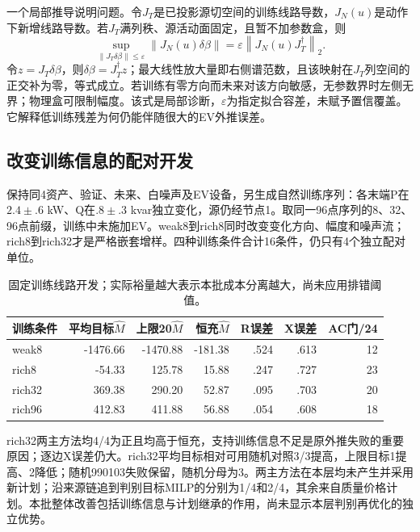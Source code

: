 \documentclass[UTF8,fontset=fandol,11pt,a4paper]{ctexart}
\newcommand{\norm}[1]{\left\lVert#1\right\rVert}
\begin{document}
一个局部推导说明问题。令$J_T$是已投影源切空间的训练线路导数，$J_N(u)$是动作下新增线路导数。若$J_T$满列秩、源活动面固定，且暂不加参数盒，则
\begin{equation}
 \sup_{\norm{J_T\delta\beta}\le\varepsilon}\norm{J_N(u)\delta\beta}
 =\varepsilon\norm{J_N(u)J_T^\dagger}_2.
 \label{eq:fixedtrain-amplification}
\end{equation}
令$z=J_T\delta\beta$，则$\delta\beta=J_T^\dagger z$；最大线性放大量即右侧谱范数，且该映射在$J_T$列空间的正交补为零，等式成立。若训练有零方向而未来对该方向敏感，无参数界时左侧无界；物理盒可限制幅度。该式是局部诊断，$\varepsilon$为指定拟合容差，未赋予置信覆盖。它解释低训练残差为何仍能伴随很大的EV外推误差。

\subsection{改变训练信息的配对开发}
保持同4资产、验证、未来、白噪声及EV设备，另生成自然训练序列：各末端P在$2.4\pm.6$ kW、Q在$.8\pm.3$ kvar独立变化，源仍经节点1。取同一96点序列的8、32、96点前缀，训练中未施加EV。weak8到rich8同时改变变化方向、幅度和噪声流；rich8到rich32才是严格嵌套增样。四种训练条件合计16条件，仍只有4个独立配对单位。

\begin{table}[htbp]\centering\small
\caption{固定训练线路开发；实际裕量越大表示本批成本分离越大，尚未应用排错阈值。}
\label{tab:fixedtrain-development}
\begin{tabular}{lrrrrrr}\toprule
训练条件 & 平均目标$\widehat M$ & 上限20$\widehat M$ & 恒充$\widehat M$ & R误差 & X误差 & AC门/24\\\midrule
weak8 & -1476.66 & -1470.88 & -181.38 & .524 & .613 & 12\\
rich8 & -54.33 & 125.78 & 15.88 & .247 & .727 & 23\\
rich32 & 369.38 & 290.20 & 52.87 & .095 & .703 & 20\\
rich96 & 412.83 & 411.88 & 56.88 & .054 & .608 & 18\\
\bottomrule\end{tabular}
\end{table}

rich32两主方法均4/4为正且均高于恒充，支持训练信息不足是原外推失败的重要原因；逐边X误差仍大。rich32平均目标相对可用随机对照3/3提高，上限目标1提高、2降低；随机990103失败保留，随机分母为3。两主方法在本层均未产生并采用新计划；沿来源链追到判别目标MILP的分别为1/4和2/4，其余来自质量价格计划。本批整体改善包括训练信息与计划继承的作用，尚未显示本层判别再优化的独立优势。
\end{document}
